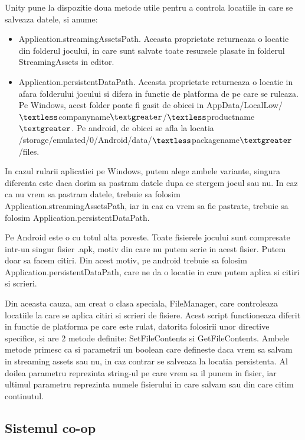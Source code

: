 \documentclass[12pt, a4paper]{article}
\begin{document}
	Unity pune la dispozitie doua metode utile pentru a controla locatiile in care se salveaza datele, si anume:
	
	\begin{itemize}
		\item Application.streamingAssetsPath. Aceasta proprietate returneaza o locatie din folderul jocului, in care sunt salvate toate resursele plasate in folderul StreamingAssets in editor.
		\item Application.persistentDataPath. Aceasta proprietate returneaza o locatie in afara folderului jocului si difera in functie de platforma de pe care se ruleaza. Pe Windows, acest folder poate fi gasit de obicei in AppData/LocalLow/$\textless$companyname$\textgreater$/$\textless$productname$\textgreater$. Pe android, de obicei se afla la locatia \newline
		/storage/emulated/0/Android/data/$\textless$packagename$\textgreater$/files.
	\end{itemize}

	In cazul rularii aplicatiei pe Windows, putem alege ambele variante, singura diferenta este daca dorim sa pastram datele dupa ce stergem jocul sau nu. In caz ca nu vrem sa pastram datele, trebuie sa folosim Application.streamingAssetsPath, iar in caz ca vrem sa fie pastrate, trebuie sa folosim Application.persistentDataPath.
	\newline
	
	Pe Android este o cu totul alta poveste. Toate fisierele jocului sunt compresate intr-un singur fisier .apk, motiv din care nu putem scrie in acest fisier. Putem doar sa facem citiri. Din acest motiv, pe android trebuie sa folosim Application.persistentDataPath, care ne da o locatie in care putem aplica si citiri si scrieri.
	\newline
	
	Din aceasta cauza, am creat o clasa speciala, FileManager, care controleaza locatiile la care se aplica citiri si scrieri de fisiere. Acest script functioneaza diferit in functie de platforma pe care este rulat, datorita folosirii unor directive specifice, si are 2 metode definite: SetFileContents si GetFileContents. Ambele metode primesc ca si parametrii un boolean care defineste daca vrem sa salvam in streaming assets sau nu, in caz contrar se salveaza la locatia persistenta. Al doilea parametru reprezinta string-ul pe care vrem sa il punem in fisier, iar ultimul parametru reprezinta numele fisierului in care salvam sau din care citim continutul.
	
	
	\subsection{Sistemul co-op}
	\label{section: coop}
	
\end{document}
